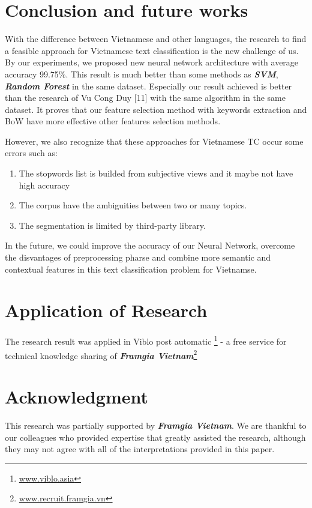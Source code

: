 \documentclass[conference]{IEEEtran}
\begin{document}
\section{Conclusion and future works}
With the difference between Vietnamese and other languages, the research to find a feasible approach for Vietnamese text classification is the new challenge of us. By our experiments, we proposed new neural network architecture with average accuracy 99.75\%. This result is much better than some methods as \textit{\textbf{SVM}}, \textbf{\textit{Random Forest}} in the same dataset. Especially our result achieved is better than the research of Vu Cong Duy [11] with the same algorithm in the same dataset. It proves that our feature selection method with keywords extraction and BoW have more effective other features selection methods.

However, we also recognize that these approaches for Vietnamese TC occur some errors such as:  
\begin{enumerate}
  \item The stopwords list is builded from subjective views and it maybe not have high accuracy
  
  \item The corpus have the ambiguities between two or many topics.
  \item The segmentation is limited by third-party library.
\end{enumerate}

In the future, we could improve the accuracy of our Neural Network, overcome the disvantages of preprocessing pharse and combine more semantic and contextual features in this text classification problem for Vietnamse. 
\section*{Application of Research}
The research result was applied in Viblo post automatic \footnote{\url{www.viblo.asia}} - a free service for technical knowledge sharing of \textbf{\textit{Framgia Vietnam}}\footnote{\url{www.recruit.framgia.vn}}

\section*{Acknowledgment}


This research was partially supported by \textbf{\textit{Framgia Vietnam}}. We are thankful to our colleagues who provided  expertise that greatly assisted the research, although they may not agree with all of the interpretations provided in this paper.
\end{document}
